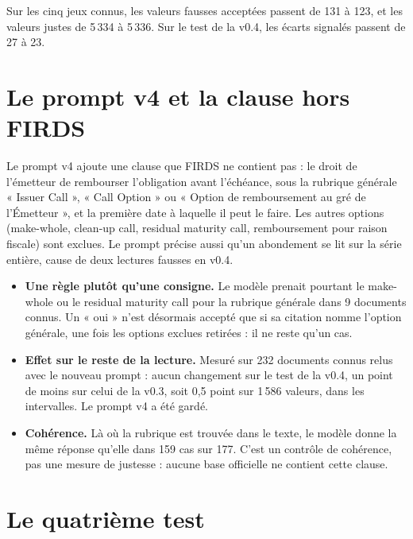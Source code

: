 \documentclass[11pt,a4paper]{article}
\begin{document}
Sur les cinq jeux connus, les valeurs fausses acceptées passent de 131 à 123, et les valeurs justes de 5\,334 à 5\,336. Sur le test de la v0.4, les écarts signalés passent de 27 à 23.

\section{Le prompt v4 et la clause hors FIRDS}

Le prompt v4 ajoute une clause que FIRDS ne contient pas : le droit de l'émetteur de rembourser l'obligation avant l'échéance, sous la rubrique générale « Issuer Call », « Call Option » ou « Option de remboursement au gré de l'Émetteur », et la première date à laquelle il peut le faire. Les autres options (make-whole, clean-up call, residual maturity call, remboursement pour raison fiscale) sont exclues. Le prompt précise aussi qu'un abondement se lit sur la série entière, cause de deux lectures fausses en v0.4.

\begin{itemize}
  \item \textbf{Une règle plutôt qu'une consigne.} Le modèle prenait pourtant le make-whole ou le residual maturity call pour la rubrique générale dans 9 documents connus. Un « oui » n'est désormais accepté que si sa citation nomme l'option générale, une fois les options exclues retirées : il ne reste qu'un cas.
  \item \textbf{Effet sur le reste de la lecture.} Mesuré sur 232 documents connus relus avec le nouveau prompt : aucun changement sur le test de la v0.4, un point de moins sur celui de la v0.3, soit 0,5 point sur 1\,586 valeurs, dans les intervalles. Le prompt v4 a été gardé.
  \item \textbf{Cohérence.} Là où la rubrique est trouvée dans le texte, le modèle donne la même réponse qu'elle dans 159 cas sur 177. C'est un contrôle de cohérence, pas une mesure de justesse : aucune base officielle ne contient cette clause.
\end{itemize}


\section{Le quatrième test}
\end{document}
